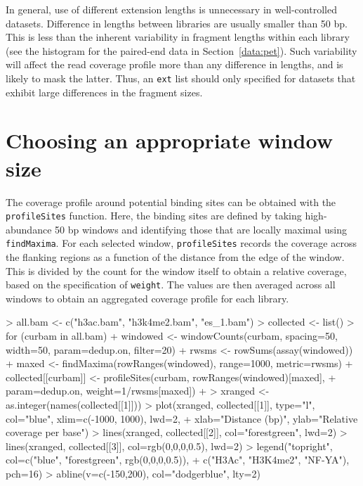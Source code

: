 \documentclass[12pt]{report}
\renewenvironment{Schunk}{\vspace{0pt}}{\vspace{0pt}}
\newcommand{\code}[1]{{\small\texttt{#1}}}
\begin{document}
In general, use of different extension lengths is unnecessary in well-controlled datasets.
Difference in lengths between libraries are usually smaller than 50 bp.
This is less than the inherent variability in fragment lengths within each library (see the histogram for the paired-end data in Section~\ref{data:pet}).
Such variability will affect the read coverage profile more than any difference in lengths, and is likely to mask the latter.
Thus, an \code{ext} list should only specified for datasets that exhibit large differences in the fragment sizes.

\section{Choosing an appropriate window size}
The coverage profile around potential binding sites can be obtained with the \code{profileSites} function.
Here, the binding sites are defined by taking high-abundance 50 bp windows and identifying those that are locally maximal using \code{findMaxima}.
For each selected window, \code{profileSites} records the coverage across the flanking regions as a function of the distance from the edge of the window.
This is divided by the count for the window itself to obtain a relative coverage, based on the specification of \code{weight}.
The values are then averaged across all windows to obtain an aggregated coverage profile for each library.

\begin{Schunk}
\begin{Sinput}
> all.bam <- c("h3ac.bam", "h3k4me2.bam", "es_1.bam")
> collected <- list()
> for (curbam in all.bam) {
+     windowed <- windowCounts(curbam, spacing=50, width=50, param=dedup.on, filter=20)
+     rwsms <- rowSums(assay(windowed))
+     maxed <- findMaxima(rowRanges(windowed), range=1000, metric=rwsms)
+     collected[[curbam]] <- profileSites(curbam, rowRanges(windowed)[maxed], 
+         param=dedup.on, weight=1/rwsms[maxed])
+ }
> xranged <- as.integer(names(collected[[1]]))
> plot(xranged, collected[[1]], type="l", col="blue", xlim=c(-1000, 1000), lwd=2, 
+     xlab="Distance (bp)", ylab="Relative coverage per base")
> lines(xranged, collected[[2]], col="forestgreen", lwd=2)
> lines(xranged, collected[[3]], col=rgb(0,0,0,0.5), lwd=2)
> legend("topright", col=c("blue", "forestgreen", rgb(0,0,0,0.5)),
+     c("H3Ac", "H3K4me2", "NF-YA"), pch=16)
> abline(v=c(-150,200), col="dodgerblue", lty=2)
\end{Sinput}
\end{Schunk}
\end{document}
